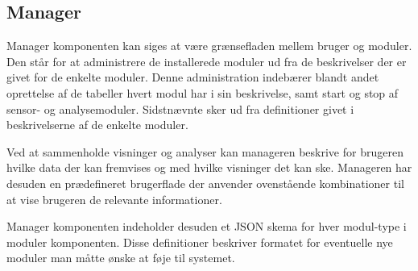 \subsection*{Manager}
Manager komponenten kan siges at være grænsefladen mellem bruger og moduler.
Den står for at administrere de installerede moduler ud fra de beskrivelser der er givet for de enkelte moduler.
Denne administration indebærer blandt andet oprettelse af de tabeller hvert modul har i sin beskrivelse, samt start og stop af sensor- og analysemoduler.
Sidstnævnte sker ud fra definitioner givet i beskrivelserne af de enkelte moduler.

Ved at sammenholde visninger og analyser kan manageren beskrive for brugeren hvilke data der kan fremvises og med hvilke visninger det kan ske.
Manageren har desuden en prædefineret brugerflade der anvender ovenstående kombinationer til at vise brugeren de relevante informationer.

Manager komponenten indeholder desuden et JSON skema for hver modul-type i moduler komponenten.
Disse definitioner beskriver formatet for eventuelle nye moduler man måtte ønske at føje til systemet.

